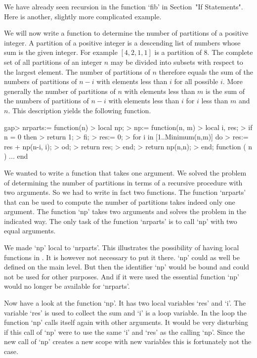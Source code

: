 
We have already seen recursion in the function `fib'
in Section~"If Statements".
Here is another, slightly more complicated example.

We will now write  a function to  determine the number of partitions of a
positive integer.  A partition of a positive integer is a descending list
of  numbers whose sum is the given integer.  For example $[4,2,1,1]$ is a
partition of 8.  The complete set of all partitions of an integer $n$ may
be divided into subsets with respect to the largest  element.  The number
of  partitions of  $n$  therefore  equals  the  sum  of  the  numbers  of
partitions  of $n-i$ with  elements less than  $i$ for all possible  $i$.
More generally the  number of partitions of  $n$ with elements  less than
$m$ is the sum  of  the numbers of partitions of $n-i$ with elements less
than  $i$ for $i$ less than  $m$ and  $n$.  This description  yields  the
following function.

\beginexample
gap> nrparts:= function(n)
>    local np;
>    np:= function(n, m)
>       local i, res;
>       if n = 0 then
>          return 1;
>       fi;
>       res:= 0;
>       for i in [1..Minimum(n,m)] do
>          res:= res + np(n-i, i);
>       od;
>       return res;
>    end;
>    return np(n,n);
> end;
function ( n ) ... end
\endexample

We wanted to  write a function that  takes one argument.   We solved  the
problem of determining the number  of partitions in  terms of a recursive
procedure with two arguments.  So we had to write  in fact two functions.
The  function  `nrparts' that  can  be  used  to  compute the  number  of
partitions takes indeed only one  argument.  The  function `np' takes two
arguments and solves the problem in the indicated way.  The  only task of
the function `nrparts' is to call `np' with two equal arguments.

We made `np'  local to `nrparts'.   This  illustrates the  possibility of
having local functions in {\GAP}.   It is however not necessary to put it
there.  `np' could as  well be defined on the main level.   But  then the
identifier `np'  would be bound and could not be used for other purposes.
And  if  it were used  the essential  function  `np' would no  longer  be
available for `nrparts'.

Now have a look at the function `np'. It has two local variables `res' and
`i'. The variable `res' is used to collect the sum and `i' is a loop
variable. In the loop the function `np' calls itself again with other
arguments. It would be very disturbing if this call of `np' were to use the
same `i' and `res' as the calling `np'. Since the new call of `np' creates a
new scope with new variables this is fortunately not the case.

